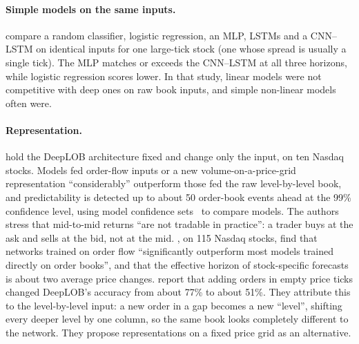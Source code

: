 \paragraph{Simple models on the same inputs.} \citet{briola2020} compare a random classifier,
logistic regression, an MLP, LSTMs and a CNN--LSTM on identical inputs for one large-tick stock (one whose spread is usually a single tick). The
MLP matches or exceeds the CNN--LSTM at all three horizons, while logistic regression scores lower.
In that study, linear models were not competitive with deep ones on raw book inputs, and simple
non-linear models often were.

\paragraph{Representation.} \citet{lucchese2024} hold the DeepLOB architecture fixed and change only
the input, on ten Nasdaq stocks. Models fed order-flow inputs or a new volume-on-a-price-grid
representation ``considerably'' outperform those fed the raw level-by-level book, and predictability
is detected up to about 50 order-book events ahead at the 99\% confidence level, using model
confidence sets~\citep{hansen2011mcs} to compare models. The authors stress that mid-to-mid returns
``are not tradable in practice'': a trader buys at the ask and sells at the bid, not at the mid. \citet{kolm2023}, on 115 Nasdaq stocks, find that networks
trained on order flow ``significantly outperform most models trained directly on order books'', and
that the effective horizon of stock-specific forecasts is about two average price changes. \citet{wu2021robust} report that adding orders in
empty price ticks changed DeepLOB's accuracy from about 77\% to about 51\%. They attribute this to the
level-by-level input: a new order in a gap becomes a new ``level'', shifting every deeper level by one column, so
the same book looks completely different to the network. They propose representations on a fixed price grid as an
alternative.

